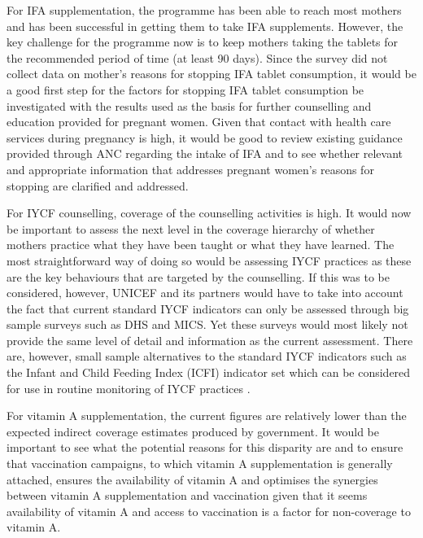 \documentclass[12pt,a4paper]{article}
\begin{document}
For IFA supplementation, the programme has been able to reach most mothers and has been successful in getting them to take IFA supplements. However, the key challenge for the programme now is to keep mothers taking the tablets for the recommended period of time (at least 90 days). Since the survey did not collect data on mother's reasons for stopping IFA tablet consumption, it would be a good first step for the factors for stopping IFA tablet consumption be investigated with the results used as the basis for further counselling and education provided for pregnant women. Given that contact with health care services during pregnancy is high, it would be good to review existing guidance provided through ANC regarding the intake of IFA and to see whether relevant and appropriate information that addresses pregnant women's reasons for stopping are clarified and addressed.

For IYCF counselling, coverage of the counselling activities is high. It would now be important to assess the next level in the coverage hierarchy of whether mothers practice what they have been taught or what they have learned. The most straightforward way of doing so would be assessing IYCF practices as these are the key behaviours that are targeted by the counselling. If this was to be considered, however, UNICEF and its partners would have to take into account the fact that current standard IYCF indicators can only be assessed through big sample surveys such as DHS and MICS. Yet these surveys would most likely not provide the same level of detail and information as the current assessment. There are, however, small sample alternatives to the standard IYCF indicators such as the Infant and Child Feeding Index (ICFI) indicator set which can be considered for use in routine monitoring of IYCF practices \citep{Guevarra:2016uw}.

For vitamin A supplementation, the current figures are relatively lower than the expected indirect coverage estimates produced by government. It would be important to see what the potential reasons for this disparity are and to ensure that vaccination campaigns, to which vitamin A supplementation is generally attached, ensures the availability of vitamin A and optimises the synergies between vitamin A supplementation and vaccination given that it seems availability of vitamin A and access to vaccination is a factor for non-coverage to vitamin A.
\end{document}

